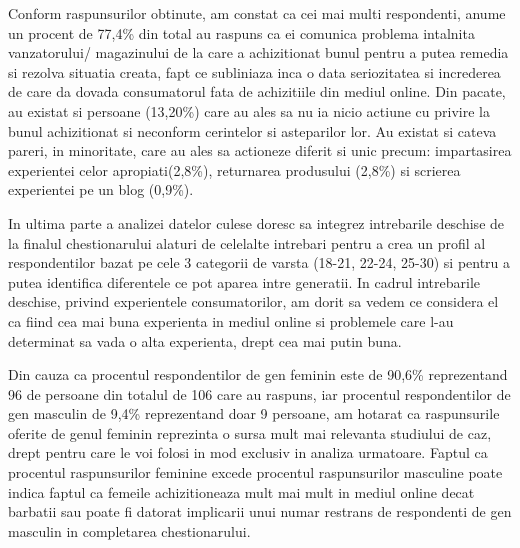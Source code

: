 \documentclass[a4paper, 12pt]{article}
\begin{document}
	\quad Conform raspunsurilor obtinute, am constat ca cei mai multi respondenti, anume un procent de 77,4\% din total au raspuns ca ei comunica problema intalnita vanzatorului/ magazinului de la care a achizitionat bunul pentru a putea remedia si rezolva situatia creata, fapt ce subliniaza inca o data seriozitatea si increderea de care da dovada consumatorul fata de achizitiile din mediul online. Din pacate, au existat si persoane (13,20\%) care au ales sa nu ia nicio actiune cu privire la bunul achizitionat si neconform cerintelor si asteparilor lor. Au existat si cateva pareri, in minoritate, care au ales sa actioneze diferit si unic precum: impartasirea experientei celor apropiati(2,8\%), returnarea produsului (2,8\%) si scrierea experientei pe un blog (0,9\%).
	
	\quad In ultima parte a analizei datelor culese doresc sa integrez intrebarile deschise de la finalul chestionarului alaturi de celelalte intrebari pentru a crea un profil al respondentilor bazat pe cele 3 categorii de varsta (18-21, 22-24, 25-30) si pentru a putea identifica diferentele ce pot aparea intre generatii. In cadrul intrebarile deschise, privind experientele consumatorilor, am dorit sa vedem ce considera  el ca fiind cea mai buna experienta in mediul online si problemele care l-au determinat sa vada o alta experienta, drept cea mai putin buna.
	
	\quad Din cauza ca procentul respondentilor de gen feminin este de 90,6\% reprezentand 96 de persoane din totalul de 106 care au raspuns, iar procentul respondentilor de gen masculin de 9,4\% reprezentand doar 9 persoane, am hotarat ca raspunsurile oferite de genul feminin reprezinta o sursa mult mai relevanta studiului de caz, drept pentru care le voi folosi in mod exclusiv in analiza urmatoare. Faptul ca procentul raspunsurilor feminine excede procentul raspunsurilor masculine poate indica faptul ca femeile achizitioneaza mult mai mult in mediul online decat barbatii sau poate fi datorat implicarii unui numar restrans de respondenti de gen masculin in completarea chestionarului.
\newline
	
\end{document}
